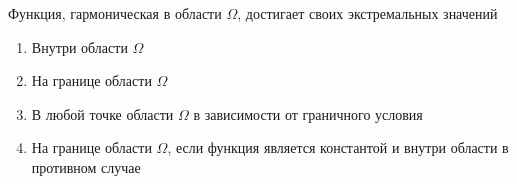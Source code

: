 Функция, гармоническая в области \(\Omega\), достигает своих экстремальных значений

\begin{enumerate}[label=\arabic*)]
    \item Внутри области \(\Omega\)
    \item На границе области \(\Omega\)
    \item В любой точке области \(\Omega\) в зависимости от граничного условия
    \item На границе области \(\Omega\), если функция является константой и внутри области в противном случае
\end{enumerate}

